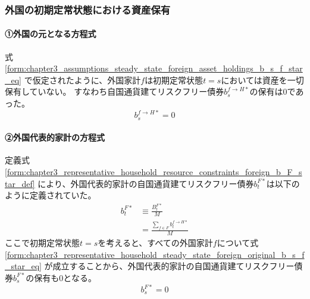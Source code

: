 \subsubsection{外国の初期定常状態における資産保有}
\label{sec:chapter3_representative_household_steady_state_foreign}

\paragraph{①外国の元となる方程式}
\label{sec:chapter3_representative_household_steady_state_foreign_original}
式
\eqref{form:chapter3_assumptions_steady_state_foreign_asset_holdings_b_s_f_star_eq}
で仮定されたように、外国家計\(f\)は初期定常状態\(t=s\)においては資産を一切保有していない。
すなわち自国通貨建てリスクフリー債券\(b_s^{f\to H*}\)の保有は0であった。
\begin{equation}
\label{form:chapter3_representative_household_steady_state_foreign_original_b_s_f_star_eq}
    b_s^{f\to H*}=0
\end{equation}

\paragraph{②外国代表的家計の方程式}
\label{sec:chapter3_representative_household_steady_state_foreign_representative}
定義式
\eqref{form:chapter3_representative_household_resource_constraints_foreign_b_F_star_def}
により、外国代表的家計の自国通貨建てリスクフリー債券\(b_t^{F*}\)は以下のように定義されていた。
\begin{equation}
\label{form:chapter3_representative_household_steady_state_foreign_representative_b_F_star_def}
    \begin{aligned}
        b_t^{F*}&\equiv\frac{B_t^{F*}}{M} \\
        &=\frac{\sum_{f\in F}b_t^{f\to H*}}{M}
    \end{aligned}
\end{equation}
ここで初期定常状態\(t=s\)を考えると、すべての外国家計\(f\)について式
\eqref{form:chapter3_representative_household_steady_state_foreign_original_b_s_f_star_eq}
が成立することから、外国代表的家計の自国通貨建てリスクフリー債券\(b_s^{F*}\)の保有も0となる。
\begin{equation}
\label{form:chapter3_representative_household_steady_state_foreign_representative_b_s_F_star_eq}
    b_s^{F*}=0
\end{equation}